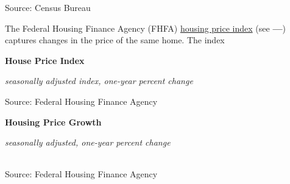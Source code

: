 \documentclass{report}
\makeatletter
\newcommand{\tbllink}[1]{\href{https://raw.githubusercontent.com/bdecon/US-chartbook/master/chartbook/data/#1}{\faTable}}
\newcommand*\short[1]{\expandafter\@gobbletwo\number\numexpr#1\relax}
\newcommand{\dateaxisticks}{
		date coordinates in=x, axis line style={draw=none},
		xmax={2020-10-01},
		max space between ticks=40,	    
		xtick={{1990-01-01}, {1992-01-01}, {1994-01-01}, 
			{1996-01-01}, {1998-01-01}, {2000-01-01}, 
			{2002-01-01}, {2004-01-01}, {2006-01-01},
			{2008-01-01}, {2010-01-01}, {2012-01-01}, {2014-01-01},
		    {2016-01-01}, {2018-01-01}, {2020-01-01}},
		minor xtick={{1989-01-01}, {1991-01-01}, {1993-01-01},
			{1995-01-01}, {1997-01-01}, {1999-01-01}, 
			{2001-01-01}, {2003-01-01}, {2005-01-01}, {2007-01-01},
		    {2009-01-01}, {2011-01-01}, {2013-01-01}, {2015-01-01},
		    {2017-01-01}, {2019-01-01}},
		enlarge y limits={0.06}, enlarge x limits={0.01},
		}
\newcommand{\bbar}[2]{extra #1 ticks = {{#2}}, extra #1 tick labels = ,
		extra #1 tick style = {grid=major, grid style={thick, black!25}},}
\newcommand{\thickline}[4]{\addplot[ultra thick, no markers, color=#1] 
		table [x=#2, y=#3, col sep=comma] {#4};	}
\newcommand{\rebars}{
		\fill[color=black!10] (axis cs:{2007-12-01},\pgfkeysvalueof{/pgfplots/ymin}) rectangle 
			(axis cs:{2009-07-01}, \pgfkeysvalueof{/pgfplots/ymax});
		\fill[color=black!10] (axis cs:{2001-03-01},\pgfkeysvalueof{/pgfplots/ymin}) rectangle 
			(axis cs:{2001-11-01}, \pgfkeysvalueof{/pgfplots/ymax});
		\fill[color=black!10] (axis cs:{2020-02-01},\pgfkeysvalueof{/pgfplots/ymin}) rectangle 
			(axis cs:{2020-10-01}, \pgfkeysvalueof{/pgfplots/ymax});}
\makeatother
\begin{document}
{{{\begin{minipage}{0.76\textwidth}
\footnotesize{Source: Census Bureau} \hfill \tbllink{permits.csv}

\end{minipage}

\newpage

\begin{minipage}{0.76\textwidth}

\small The Federal Housing Finance Agency (FHFA) \href{https://www.fhfa.gov/DataTools/Downloads/Pages/House-Price-Index-Datasets.aspx}{housing price index} (see {\color{blue!40!cyan}\textbf{---}}) captures changes in the price of the same home. The index 

\vspace{3mm}

\normalsize \textbf{House Price Index}

\footnotesize{\textit{seasonally adjusted index, one-year percent change}}

\hspace*{-2mm} 

\footnotesize{Source: Federal Housing Finance Agency} \hfill \tbllink{hpi.csv}

\vspace{4mm}

\normalsize{\textbf{Housing Price Growth}}

\footnotesize{\textit{seasonally adjusted, one-year percent change}}

\hspace*{-3mm} \noindent {} \setlength{\tabcolsep}{3.1pt} \color{black!90}
		{\renewcommand{\arraystretch}{1.5}
		 \begin{tabular}{p{24mm} R{7.1mm} R{7.1mm} R{7.1mm} R{7.1mm} R{7.1mm} R{7.1mm} R{7.1mm} R{12.0mm} R{10.8mm}}
			 \hline
		\end{tabular}}
		
\vspace{1mm}
		
\footnotesize{Source: Federal Housing Finance Agency} \hfill \tbllink{hpi.csv}


\end{minipage}}}}
\end{document}
